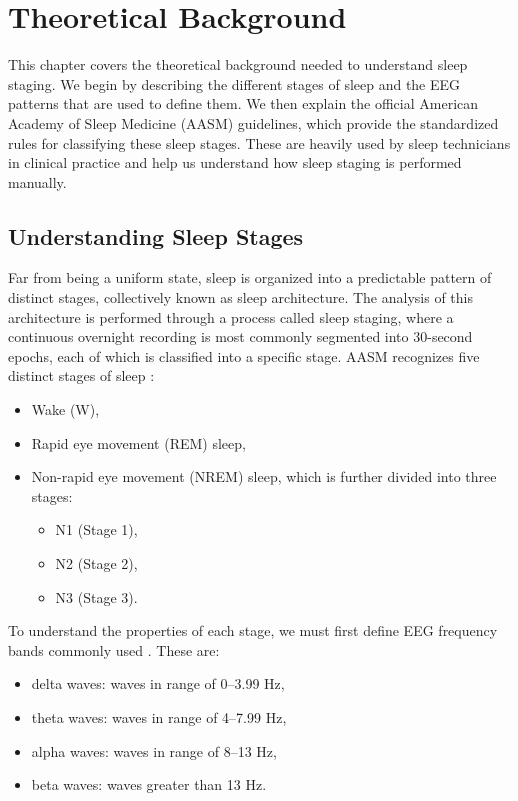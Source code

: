 \chapter{Theoretical Background}
This chapter covers the theoretical background
needed to understand sleep staging.
We begin by describing the different stages
of sleep and the EEG patterns
that are used to define them. We then explain the official
American Academy of Sleep Medicine (AASM) guidelines, which provide the standardized rules
for classifying these sleep stages. These are heavily
used by sleep technicians in clinical practice and
help us understand how sleep staging is performed manually.

\section{Understanding Sleep Stages} \label{sec:understanding_sleep_stages}
Far from being a uniform state,
sleep is organized into a predictable pattern of distinct stages, collectively known as
sleep architecture. The analysis of this architecture is performed through a process
called sleep staging, where a continuous overnight recording is most commonly segmented into 30-second epochs,
each of which is classified into a specific stage.
AASM recognizes five distinct stages of sleep \cite{AASM}:
\begin{itemize}
    \item Wake (W),
    \item Rapid eye movement (REM) sleep,
    \item Non-rapid eye movement (NREM) sleep, which is further divided into three stages:
    \begin{itemize}
        \item N1 (Stage 1),
        \item N2 (Stage 2),
        \item N3 (Stage 3).
    \end{itemize}
\end{itemize}

To understand the properties of each stage, we must first define EEG frequency bands commonly used \cite{AASM}. These are:
\begin{itemize}
    \item delta waves: waves in range of 0–3.99 Hz,
    \item theta waves: waves in range of 4–7.99 Hz,
    \item alpha waves: waves in range of 8–13 Hz,
    \item beta waves: waves greater than 13 Hz.
\end{itemize}

